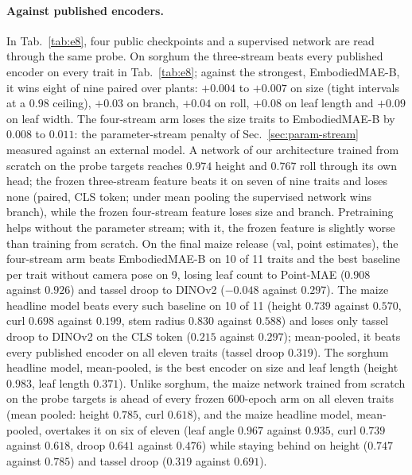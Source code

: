 \paragraph{Against published encoders.}
In Tab.~\ref{tab:e8}, four public checkpoints and a supervised network are
read through the same probe. On sorghum the three-stream \CropCode{} beats every
published encoder on every trait in Tab.~\ref{tab:e8}; against the strongest,
EmbodiedMAE-B, it wins eight of nine paired over plants: $+0.004$ to $+0.007$
on size (tight intervals at a $0.98$ ceiling), $+0.03$ on branch, $+0.04$ on
roll, $+0.08$ on leaf length and $+0.09$ on leaf width. The four-stream arm
loses the size traits to EmbodiedMAE-B by $0.008$ to $0.011$: the
parameter-stream penalty of Sec.~\ref{sec:param-stream} measured against an
external model. A network of our architecture trained from scratch on the probe
targets reaches $0.974$ height and $0.767$ roll through its own head; the
frozen three-stream feature beats it on seven of nine traits and loses none
(paired, CLS token; under mean pooling the supervised network wins branch),
while the frozen four-stream feature loses size and branch. Pretraining helps
without the parameter stream; with it, the frozen feature is slightly worse than
training from scratch. On the final maize release (val, point estimates), the
four-stream arm beats EmbodiedMAE-B on 10 of 11 traits and the best baseline per
trait without camera pose on 9, losing leaf count to Point-MAE ($0.908$ against
$0.926$) and tassel droop to DINOv2 ($-0.048$ against $0.297$). The maize
headline model beats every such baseline on 10 of 11 (height $0.739$ against
$0.570$, curl $0.698$ against $0.199$, stem radius $0.830$ against $0.588$) and
loses only tassel droop to DINOv2 on the CLS token ($0.215$ against $0.297$);
mean-pooled, it beats every published encoder on all eleven traits (tassel
droop $0.319$). The sorghum headline model, mean-pooled, is the best encoder on
size and leaf length (height $0.983$, leaf length $0.371$). Unlike sorghum, the maize
network trained from scratch on the probe targets is ahead of every frozen
600-epoch arm on all eleven traits (mean pooled: height $0.785$, curl $0.618$),
and the maize headline model, mean-pooled, overtakes it on six of eleven
(leaf angle $0.967$ against $0.935$, curl $0.739$ against $0.618$, droop $0.641$
against $0.476$) while staying behind on height ($0.747$ against $0.785$) and
tassel droop ($0.319$ against $0.691$).

